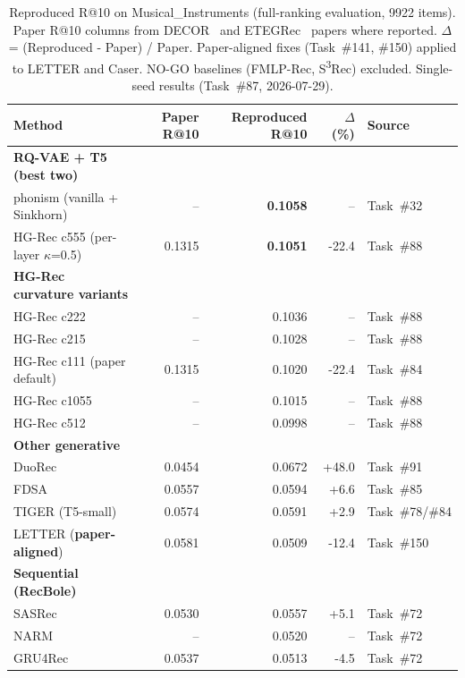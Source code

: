 \begin{table}[t]
\centering
\caption{Reproduced R@10 on Musical_Instruments (full-ranking evaluation, 9922 items).
Paper R@10 columns from DECOR~\cite{cao2022decor} and ETEGRec~\cite{chen2024etegrec} papers where reported.
$\Delta$ = (Reproduced - Paper) / Paper. Paper-aligned fixes (Task~\#141, \#150) applied to LETTER and Caser.
NO-GO baselines (FMLP-Rec, S\textsuperscript{3}Rec) excluded. Single-seed results (Task~\#87, 2026-07-29).}
\label{tab:ranking_v3}
\small
\begin{tabular}{l r r r l}
\toprule
Method & Paper R@10 & Reproduced R@10 & $\Delta$ (\%) & Source \\
\midrule
\textbf{RQ-VAE + T5 (best two)} & & & & \\
\quad phonism (vanilla + Sinkhorn) & -- & \textbf{0.1058} & -- & Task~\#32 \\
\quad HG-Rec c555 (per-layer $\kappa$=0.5) & 0.1315 & \textbf{0.1051} & -22.4 & Task~\#88 \\
\midrule
\textbf{HG-Rec curvature variants} & & & & \\
\quad HG-Rec c222 & -- & 0.1036 & -- & Task~\#88 \\
\quad HG-Rec c215 & -- & 0.1028 & -- & Task~\#88 \\
\quad HG-Rec c111 (paper default) & 0.1315 & 0.1020 & -22.4 & Task~\#84 \\
\quad HG-Rec c1055 & -- & 0.1015 & -- & Task~\#88 \\
\quad HG-Rec c512 & -- & 0.0998 & -- & Task~\#88 \\
\midrule
\textbf{Other generative} & & & & \\
\quad DuoRec & 0.0454 & 0.0672 & +48.0 & Task~\#91 \\
\quad FDSA & 0.0557 & 0.0594 & +6.6 & Task~\#85 \\
\quad TIGER (T5-small) & 0.0574 & 0.0591 & +2.9 & Task~\#78/\#84 \\
\quad LETTER (\textbf{paper-aligned}) & 0.0581 & 0.0509 & -12.4 & Task~\#150 \\
\midrule
\textbf{Sequential (RecBole)} & & & & \\
\quad SASRec & 0.0530 & 0.0557 & +5.1 & Task~\#72 \\
\quad NARM & -- & 0.0520 & -- & Task~\#72 \\
\quad GRU4Rec & 0.0537 & 0.0513 & -4.5 & Task~\#72 \\

\end{tabular}
\end{table}
